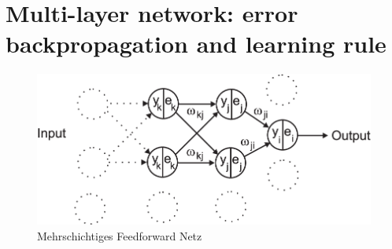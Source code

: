 \documentclass[12pt]{article}
\begin{document}
\section{Multi-layer network: error backpropagation and learning rule}
\begin{figure}[!hbt]
\begin{center}
\mbox{\includegraphics[width=\textwidth]{multi_layer}}
\end{center}
\caption{Mehrschichtiges Feedforward Netz
\label{multi_layer}}
\end{figure}
\end{document}
